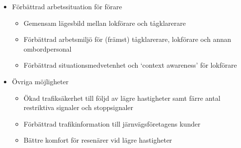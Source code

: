 \begin{itemize}
\begin{itemize}
        \item Minskade verksamhetskostnader för järnvägsföretag till följ av minskat slitage och energikonsumtion~\cite{}
        \item Minskad miljöpåverkan till följd av lägre energikonsumtion och slitage~\cite{Lindmark2022}
    \end{itemize}
    \item Förbättrad arbetssituation för förare
    \begin{itemize}
        \item Gemensam lägesbild mellan lokförare och tågklarerare~\cite{Lindmark2022}
        \item Förbättrad arbetsmiljö för (främst) tågklarerare, lokförare och annan ombordpersonal~\cite{Systemdefinition2019}
        \item Förbättrad situationsmedvetenhet och \lq{}context awareness\rq{} för lokförare~\cite{IRS90940, Bae2014, Cwil2018}
    \end{itemize}
    \item Övriga möjligheter
    \begin{itemize}
        \item Ökad trafiksäkerhet till följd av lägre hastigheter samt färre antal restriktiva signaler och stoppsignaler~\cite{Olsson2023}
        \item Förbättrad trafikinformation till järnvägsföretagens kunder~\cite{Angel2020, Lindmark2022}
        \item Bättre komfort för resenärer vid lägre hastigheter~\cite{Lindmark2022, Systemdefinition2019}
    \end{itemize}
\end{itemize}
